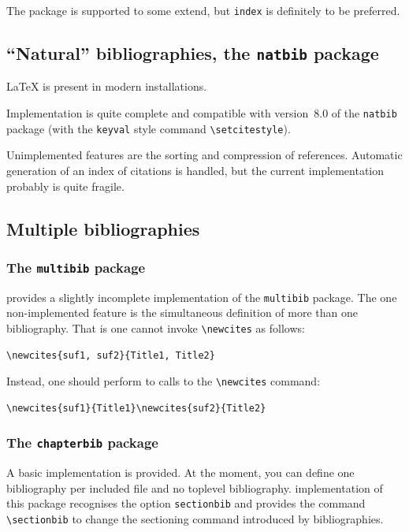 The  package is
supported to some extend, but \texttt{index} is definitely to be
preferred.

\subsection{``Natural'' bibliographies, the \texttt{natbib} package }
\LaTeX{} 
is present in modern installations.

Implementation is quite complete and compatible
with version~8.0 of the \texttt{natbib} package
(with the \texttt{keyval} style command \verb+\setcitestyle+).

Unimplemented features are the sorting and compression of references.
Automatic generation of an index of citations is handled, but
the current implementation probably is quite fragile.

\subsection{Multiple bibliographies}

\subsubsection*{The \texttt{multibib} package}
\hevea{} provides a slightly incomplete implementation of the
\texttt{multibib} package. The one non-implemented feature is the
simultaneous definition of more than one bibliography.
That is one cannot invoke \verb+\newcites+ as follows:
\begin{verbatim}
\newcites{suf1, suf2}{Title1, Title2}
\end{verbatim}
Instead, one should perform to calls to the \verb+\newcites+ command:
\begin{verbatim}
\newcites{suf1}{Title1}\newcites{suf2}{Title2}
\end{verbatim}


\subsubsection*{The \texttt{chapterbib} package}
A basic implementation is provided. At the moment, you can
define one bibliography per included file and no toplevel
bibliography.
\hevea{} implementation of this package recognises the option
\verb+sectionbib+ and provides the command \verb+\sectionbib+
to change the sectioning command introduced by bibliographies.


